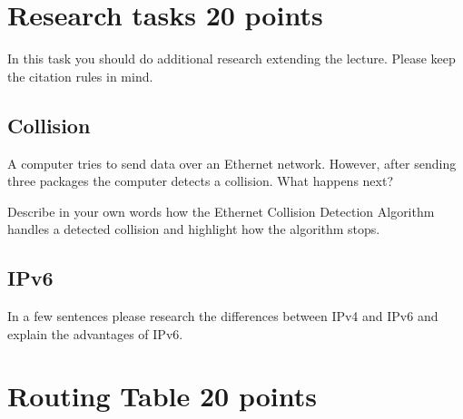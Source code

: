 \documentclass{resources/WeSTassignment}
\begin{document}
\section{Research tasks \hfill {20 points}}
In this task you should do additional research extending the lecture. Please keep the citation rules in mind.
\subsection{Collision}
A computer tries to send data over an Ethernet network. However, after sending three packages the computer detects a collision.
What happens next? 

Describe in your own words how the Ethernet Collision Detection Algorithm handles a detected collision and highlight how the algorithm stops.

\subsection{IPv6}
In a few sentences please research the differences between IPv4 and IPv6 and explain the advantages of IPv6.

\section{Routing Table \hfill {20 points}}
\end{document}
